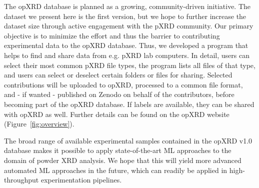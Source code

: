 The opXRD database is planned as a growing, community-driven initiative. The dataset we present here is the first version, but we hope to further increase the dataset size through active engagement with the pXRD community. Our primary objective is to minimize the effort and thus the barrier to contributing experimental data to the opXRD database. Thus, we developed a program that helps to find and share data from e.g. pXRD lab computers. In detail, users can select their most common pXRD file types, the program lists all files of that type, and users can select or deselect certain folders or files for sharing. Selected contributions will be uploaded to opXRD, processed to a common file format, and - if wanted - published on Zenodo on behalf of the contributors, before becoming part of the opXRD database. If labels are available, they can be shared with opXRD as well. Further details can be found on the opXRD website (Figure~\ref{fig:overview}).

The broad range of available experimental samples contained in the opXRD v1.0 database makes it possible to apply state-of-the-art ML approaches to the domain of powder XRD analysis.
We hope that this will yield more advanced automated ML approaches in the future, which can readily be applied in high-throughput experimentation pipelines.

